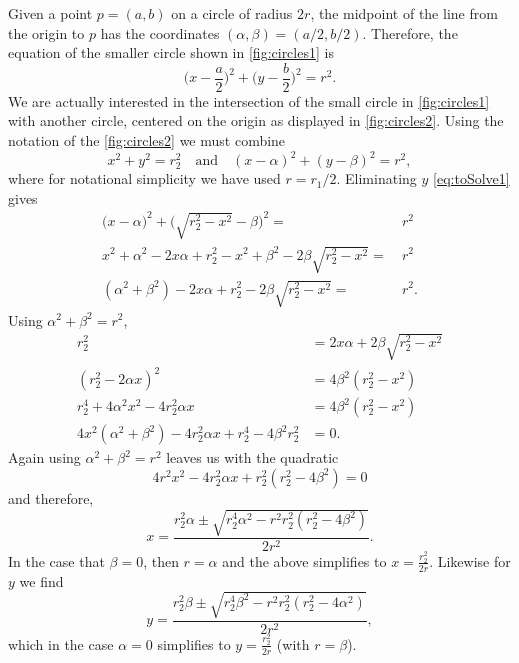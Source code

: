 \documentclass[a4paper, 12pt]{article}
\begin{document}
Given a point $p= (a, b)$ on a circle of radius $2r$, the midpoint of the line from the origin to $p$ has the coordinates $(\alpha, \beta) = (a/2, b/2)$. 
Therefore, the equation of the smaller circle shown in \cref{fig:circles1} is
\begin{equation}
  \Big( x - \frac{a}{2} \Big)^2 + \Big( y - \frac{b}{2} \Big)^2 = r^2.
\end{equation}
We are actually interested in the intersection of the small circle in \cref{fig:circles1} with another circle, centered on the origin as displayed in \cref{fig:circles2}. 
Using the notation of the \cref{fig:circles2} we must combine
\begin{equation}
  x^2 + y^2 = r_2^2 \quad \mathrm{and} \quad (x - \alpha)^2 + (y - \beta)^2 = r^2,
  \label{eq:toSolve1}
\end{equation}
where for notational simplicity we have used $r = r_1 / 2$. 
Eliminating $y$ \cref{eq:toSolve1} gives
\begin{align}
  \Big( x - \alpha \Big)^2 + \Big( \sqrt{r_2^2 - x^2} - \beta \Big)^2 = & ~ r^2 \\
  x^2 + \alpha^2 - 2x\alpha + r_2^2 - x^2 + \beta^2 -2\beta \sqrt{r_2^2 - x^2} = & ~ r^2 \\
  (\alpha ^2 + \beta^2) -2 x \alpha +r_2^2 -2\beta\sqrt{r_2^2 - x^2} = & ~ r^2.  
\end{align}
Using $\alpha^2 + \beta^2 = r^2$,
\begin{align}
  r_2 ^2 & = 2x\alpha + 2\beta \sqrt{r_2^2 - x^2} \\
  (r_2^2 - 2\alpha x )^2 & = 4\beta^2 (r_2^2 - x^2) \\
  r_2^4  + 4\alpha^2 x^2 - 4r_2^2 \alpha x & = 4\beta^2 (r_2^2 - x^2) \\
  4x^2 (\alpha^2 + \beta^2) - 4r_2^2 \alpha x + r_2^4 -4\beta^2 r_2^2 & = 0.
\end{align}
Again using $\alpha^2 + \beta^2 = r^2$ leaves us with the quadratic
\begin{equation}
  4r^2 x^2 -4 r_2^2 \alpha x +r_2^2(r_2^2 -4 \beta^2) = 0
\end{equation}
and therefore, 
\begin{equation}
  x  = \frac{r_2^2 \alpha \pm \sqrt{r_2^4\alpha^2 - r^2 r_2^2(r_2^2 - 4\beta^2)}}{2r^2}.
\end{equation}
In the case that $\beta = 0$, then $r=\alpha$ and the above simplifies to $x = \frac{r_2^2}{2r}$.
Likewise for $y$ we find
\begin{equation}
  y  = \frac{r_2^2 \beta \pm \sqrt{r_2^4\beta^2 - r^2 r_2^2(r_2^2 - 4\alpha^2)}}{2r^2},
\end{equation}
which in the case $\alpha = 0$ simplifies to $y = \frac{r_2^2}{2r}$ (with $r=\beta$).
\end{document}
